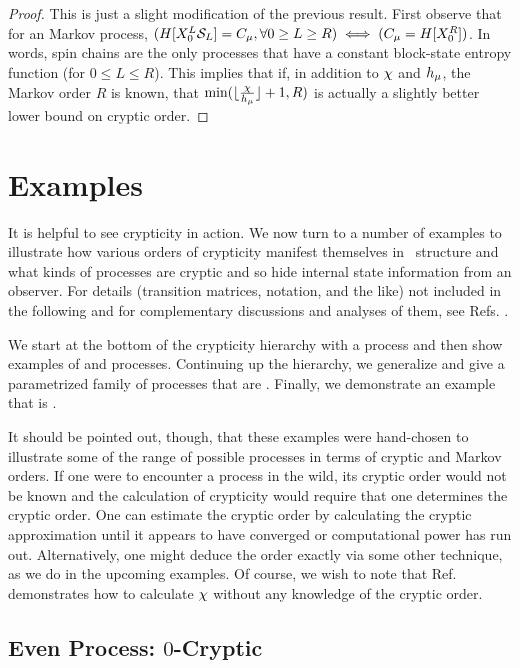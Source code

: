 \begin{proof}
This is just a slight modification of the previous result. First observe that for an  Markov process, $(H[{X}_0^L \mathcal{S}_L] = C_\mu , \forall 0 \ge L \ge R) \iff (C_\mu = H[{X}_0^R])$. In words, spin chains are the only processes that have a constant block-state entropy function (for $0 \le L \le R$). This implies that if, in addition to $\chi$ and $h_\mu$, the Markov order $R$ is known, that $\min(\lfloor\frac{\chi}{h_\mu}\rfloor + 1, R)$ is actually a slightly better lower bound on cryptic order.
\end{proof}

\section{Examples}

It is helpful to see crypticity in action. We now turn to a number of examples
to illustrate how various orders of crypticity manifest themselves in
\eM\ structure and what kinds of processes are cryptic and so hide internal
state information from an observer. For details (transition matrices, notation,
and the like) not included in the following and for complementary discussions
and analyses of them, see Refs. \cite{Crut01a,Crut08a,Crut08b}.

We start at the bottom of the crypticity hierarchy with a  process
and then show examples of  and  processes. Continuing up
the hierarchy, we generalize and give a parametrized family of processes that
are . Finally, we
demonstrate an example that is \cryptic{\infty}.

It should be pointed out, though, that these examples were hand-chosen to 
illustrate some of the range of possible processes in terms of cryptic and
 Markov orders. If one were to encounter a process in the wild, its cryptic
order would not be known and the calculation of crypticity would require that
one determines the cryptic order. One can estimate the 
cryptic order by calculating the cryptic approximation until it appears to have 
converged or computational power has run out.  Alternatively, one might deduce 
the order exactly via some other technique, as we do in the upcoming examples.  
Of course, we wish to note that Ref.~\cite{Crut08a} demonstrates how to 
calculate $\chi$ without any knowledge of the cryptic order.

\subsection{Even Process: $0$-Cryptic}

